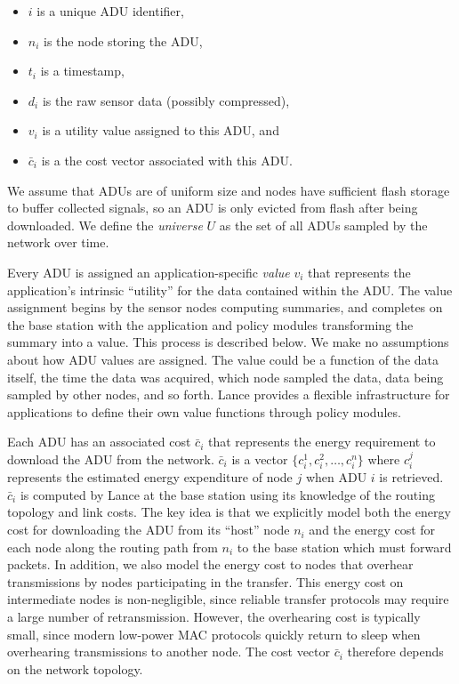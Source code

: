 \begin{itemize}

\item $i$ is a unique ADU identifier,
\vspace*{-0.1in}
\item $n_i$ is the node storing the ADU,
\vspace*{-0.1in}
\item $t_i$ is a timestamp,
\vspace*{-0.1in}
\item $d_i$ is the raw sensor data (possibly compressed),
\vspace*{-0.1in}
\item $v_i$ is a utility value assigned to this ADU, and
\vspace*{-0.1in}
\item $\bar{c}_i$ is a the cost vector associated with this ADU.

\end{itemize}

We assume that ADUs are of uniform size and nodes have sufficient flash
storage to buffer collected signals, so an ADU is only evicted from flash
after being downloaded. We define the \textit{universe} $U$ as the set of all
ADUs sampled by the network over time.

Every ADU is assigned an application-specific \textit{value} $v_i$ that
represents the application's intrinsic ``utility'' for the data contained
within the ADU. The value assignment begins by the sensor nodes computing
summaries, and completes on the base station with the application and policy
modules transforming the summary into a value. This process is described
below. We make no assumptions about how ADU values are assigned. The value
could be a function of the data itself, the time the data was acquired, which
node sampled the data, data being sampled by other nodes, and so forth.
Lance provides a flexible infrastructure for applications to define their own
value functions through policy modules.

Each ADU has an associated cost $\bar{c}_i$ that represents the energy
requirement to download the ADU from the network. $\bar{c}_i$ is a vector $\{
c_i^1, c_i^2, \ldots, c_i^n \}$ where $c_i^j$ represents the estimated energy
expenditure of node $j$ when ADU $i$ is retrieved. $\bar{c}_i$ is computed by
Lance at the base station using its knowledge of the routing topology and
link costs. The key idea is that we explicitly model both the energy cost for
downloading the ADU from its ``host'' node $n_i$ and the energy cost for each
node along the routing path from $n_i$ to the base station which must forward
packets. In addition, we also model the energy cost to nodes that overhear
transmissions by nodes participating in the transfer. This energy cost on
intermediate nodes is non-negligible, since reliable transfer protocols may
require a large number of retransmission. However, the overhearing cost is
typically small, since modern low-power MAC protocols quickly return to sleep
when overhearing transmissions to another node. The cost vector $\bar{c}_i$
therefore depends on the network topology.

